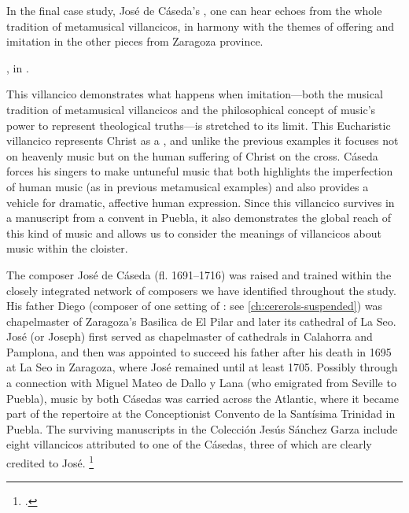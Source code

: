 In the final case study, José de Cáseda's , one can
hear echoes from the whole tradition of metamusical villancicos, in harmony
with the themes of offering and imitation in the other pieces from Zaragoza
province.%
\begin{Footnote} 
    , in \autocite{Cashner:WLSCM32}.
\end{Footnote}
This villancico demonstrates what happens when imitation---both the musical
tradition of metamusical villancicos and the philosophical concept of music's
power to represent theological truths---is stretched to its limit.
This Eucharistic villancico  represents Christ as a
, and unlike the previous examples it focuses not on heavenly
music but on the human suffering of Christ on the cross.
Cáseda forces his singers to make untuneful music that both highlights the
imperfection of human music (as in previous metamusical examples) and also
provides a vehicle for dramatic, affective human expression. 
Since this villancico survives in a manuscript from a convent in Puebla, it
also demonstrates the global reach of this kind of music and allows us to
consider the meanings of villancicos about music within the cloister.

The composer José de Cáseda (fl. 1691--1716) was raised and trained within the
closely integrated network of composers we have identified throughout the
study.%
    \Autocites
    [120--121]{Calahorra:Zaragoza2}
    {Stevenson:CasedaD}
His father Diego (composer of one setting of : see
\cref{ch:cererols-suspended}) was chapelmaster of Zaragoza's Basilica de El
Pilar and later its cathedral of La Seo.
José (or Joseph) first served as chapelmaster of cathedrals in Calahorra and
Pamplona, and then was appointed to succeed his father after his death in 1695
at La Seo in Zaragoza, where José remained until at least 1705.
Possibly through a connection with Miguel Mateo de Dallo y Lana (who emigrated
from Seville to Puebla), music by both Cásedas was carried across the Atlantic,
where it became part of the repertoire at the Conceptionist Convento de la
Santísima Trinidad in Puebla.
The surviving manuscripts in the Colección Jesús Sánchez Garza include eight
villancicos attributed to one of the Cásedas, three of which are clearly
credited to José.%
    \footnote{.}

